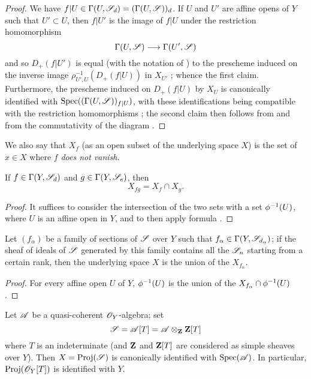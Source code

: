 \begin{proof}
We have $f|U\in\Gamma(U,\mathscr{S}_d)=(\Gamma(U,\mathscr{S}))_d$.
If $U$ and $U'$ are affine opens of $Y$ such that $U'\subset U$, then $f|U'$ is the image of $f|U$ under the restriction homomorphism
\[
  \Gamma(U,\sh{S}) \to \Gamma(U',\sh{S})
\]
and so $D_+(f|U')$ is equal (with the notation of ) to the prescheme induced on the inverse image $\rho_{U',U}^{-1}(D_+(f|U))$ in $X_{U'}$ ;
whence the first claim.
Furthermore, the prescheme induced on $D_+(f|U)$ by $X_U$ is canonically identified with $\operatorname{Spec}((\Gamma(U,\mathscr{S}))_{f|U})$, with these identifications being compatible with the restriction homomorphisms ;
the second claim then follows from  and from the commutativity of the diagram .
\end{proof}

We also say that $X_f$ (as an open subset of the underlying space $X$) is the set of $x\in X$ where $f$ \emph{does not vanish}.

\begin{corollary}[3.1.5]
\label{II.3.1.5}
If $f\in\Gamma(Y,\mathscr{S}_d)$ and $g\in\Gamma(Y,\mathscr{S}_e)$, then
\[
\label{II.3.1.5.1}
  X_{fg} = X_f\cap X_g.
\tag{3.1.5.1}
\]
\end{corollary}

\begin{proof}
It suffices to consider the intersection of the two sets with a set $\phi^{-1}(U)$, where $U$ is an affine open in $Y$, and to then apply formula .
\end{proof}

\begin{corollary}[3.1.6]
\label{II.3.1.6}
Let $(f_\alpha)$ be a family of sections of $\mathscr{S}$ over $Y$ such that $f_\alpha\in\Gamma(Y,\mathscr{S}_{d_\alpha})$;
if the sheaf of ideals of $\mathscr{S}$ generated by this family  contains all the $\mathscr{S}_n$ starting from a certain rank, then the underlying space $X$ is the union of the $X_{f_\alpha}$.
\end{corollary}

\begin{proof}
For every affine open $U$ of $Y$, $\phi^{-1}(U)$ is the union of the $X_{f_\alpha}\cap\phi^{-1}(U)$ .
\end{proof}

\begin{corollary}[3.1.7]
\label{II.3.1.7}
Let $\mathscr{A}$ be a quasi-coherent $\mathscr{O}_Y$-algebra;
set
\[
  \mathscr{S} = \mathscr{A}[T] = \mathscr{A}\otimes_{\mathbf{Z}}\mathbf{Z}[T]
\]
where $T$ is an indeterminate (and $\mathbf{Z}$ and $\mathbf{Z}[T]$ are considered as simple sheaves over $Y$).
Then $X=\operatorname{Proj}(\mathscr{S})$ is canonically identified with $\operatorname{Spec}(\mathscr{A})$.
In particular, $\operatorname{Proj}(\mathscr{O}_Y[T])$ is identified with $Y$.
\end{corollary}

